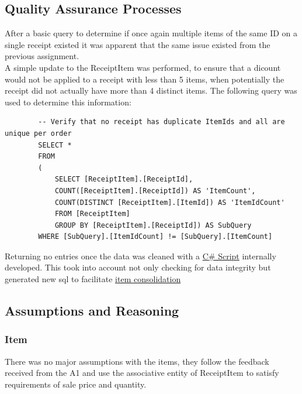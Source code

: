 \documentclass{article}
\begin{document}
        \subsection{Quality Assurance Processes}
        \label{sec:QAP}
        After a basic query to determine if once again multiple 
        items of the same ID on a single receipt existed it was 
        apparent that the same issue existed from the previous 
        assignment.
        \\
        A simple update to the ReceiptItem was performed, to ensure
        that a dicount would not be applied to a receipt with 
        less than 5 items, when potentially the receipt did not 
        actually have more than 4 distinct items.
        The following query was used to determine this information:
        \begin{lstlisting}
        -- Verify that no receipt has duplicate ItemIds and all are unique per order
        SELECT *
        FROM
        (
            SELECT [ReceiptItem].[ReceiptId], 
            COUNT([ReceiptItem].[ReceiptId]) AS 'ItemCount',
            COUNT(DISTINCT [ReceiptItem].[ItemId]) AS 'ItemIdCount'
            FROM [ReceiptItem]
            GROUP BY [ReceiptItem].[ReceiptId]) AS SubQuery 
        WHERE [SubQuery].[ItemIdCount] != [SubQuery].[ItemCount]
        \end{lstlisting}

        Returning no entries once the data was cleaned with a 
        \hyperref[sec:sharpccleaning]{\color{blue}C\# Script} internally developed.
        This took into account not only checking for data integrity
        but generated new sql to facilitate \hyperref[sec:sharpcsqlgeneration]{\color{blue}item consolidation}

        \newpage

        \subsection{Assumptions and Reasoning}
        \label{sec:AR}
            \subsubsection{Item}
                There was no major assumptions with the items,
                they follow the feedback received from the A1 
                and use the associative entity of ReceiptItem
                to satisfy requirements of sale price and quantity.
\end{document}
